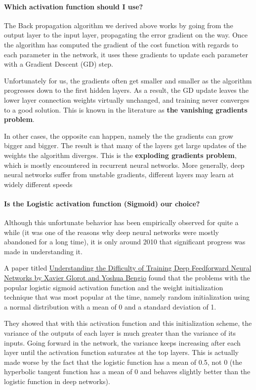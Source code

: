 \paragraph{Which activation function should I use?}
The Back propagation algorithm we derived above works by going from
the output layer to the input layer, propagating the error gradient on
the way. Once the algorithm has computed the gradient of the cost
function with regards to each parameter in the network, it uses these
gradients to update each parameter with a Gradient Descent (GD) step.

Unfortunately for us, the gradients often get smaller and smaller as the
algorithm progresses down to the first hidden layers. As a result, the
GD update leaves the lower layer connection weights
virtually unchanged, and training never converges to a good
solution. This is known in the literature as 
\textbf{the vanishing gradients problem}. 

In other cases, the opposite can happen, namely the the gradients can grow bigger and
bigger. The result is that many of the layers get large updates of the 
weights the
algorithm diverges. This is the \textbf{exploding gradients problem}, which is
mostly encountered in recurrent neural networks. More generally, deep
neural networks suffer from unstable gradients, different layers may
learn at widely different speeds

\paragraph{Is the Logistic activation function (Sigmoid)  our choice?}
Although this unfortunate behavior has been empirically observed for
quite a while (it was one of the reasons why deep neural networks were
mostly abandoned for a long time), it is only around 2010 that
significant progress was made in understanding it.

A paper titled \href{{http://proceedings.mlr.press/v9/glorot10a.html}}{Understanding the Difficulty of Training Deep
Feedforward Neural Networks by Xavier Glorot and Yoshua Bengio} found that
the problems with the popular logistic
sigmoid activation function and the weight initialization technique
that was most popular at the time, namely random initialization using
a normal distribution with a mean of 0 and a standard deviation of
1. 

They showed that with this activation function and this
initialization scheme, the variance of the outputs of each layer is
much greater than the variance of its inputs. Going forward in the
network, the variance keeps increasing after each layer until the
activation function saturates at the top layers. This is actually made
worse by the fact that the logistic function has a mean of 0.5, not 0
(the hyperbolic tangent function has a mean of 0 and behaves slightly
better than the logistic function in deep networks).

